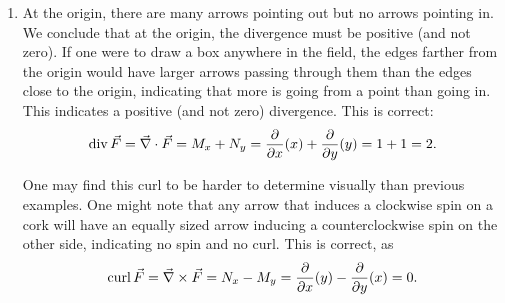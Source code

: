 \begin{example}
\begin{enumerate}
		\item
%
%
		 At the origin, there are many arrows pointing out but no arrows pointing in. We conclude that at the origin, the divergence must be positive (and not zero). If one were to draw a box anywhere in the field, the edges farther from the origin would have larger arrows passing through them than the edges close to the origin, indicating that more is going from a point than going in. This indicates a positive (and not zero) divergence. This is correct:
	\[
	\operatorname{div}\vec F = \vec\nabla \cdot \vec F
	= M_x + N_y = \frac{\partial}{\partial x}(x) + \frac{\partial}{\partial y}(y)
	= 1+1=2.
	\]
	
	One may find this curl to be harder to determine visually than previous examples. One might note that any arrow that induces a clockwise spin on a cork will have an equally sized arrow inducing a counterclockwise spin on the other side, indicating no spin and no curl. This is correct, as
	\[
	\operatorname{curl} \vec F = \vec\nabla\times\vec F
	= N_x-M_y = \frac{\partial}{\partial x}(y) - \frac{\partial}{\partial y}(x) = 0.
	\]
	

\end{enumerate}
\end{example}
